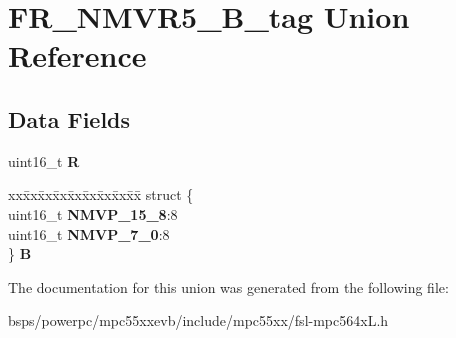 \hypertarget{unionFR__NMVR5__16B__tag}{}\section{F\+R\+\_\+\+N\+M\+V\+R5\+\_\+B\+\_\+tag Union Reference}
\label{unionFR__NMVR5__16B__tag}
\subsection*{Data Fields}
\begin{DoxyCompactItemize}
\item 
\mbox{\label{unionFR__NMVR5__16B__tag_ae0e45ba58f16ff993062fb8d672daa7f}} 
uint16\+\_\+t {\bfseries R}
\item 
\mbox{\label{unionFR__NMVR5__16B__tag_acc5908e79d72893ab63c12ff8897a3df}} 
\begin{tabbing}
xx\=xx\=xx\=xx\=xx\=xx\=xx\=xx\=xx\=\kill
struct \{\\
\>uint16\_t {\bfseries NMVP\_15\_8}:8\\
\>uint16\_t {\bfseries NMVP\_7\_0}:8\\
\} {\bfseries B}\\

\end{tabbing}\end{DoxyCompactItemize}


The documentation for this union was generated from the following file\+:\begin{DoxyCompactItemize}
\item 
bsps/powerpc/mpc55xxevb/include/mpc55xx/fsl-\/mpc564x\+L.\+h\end{DoxyCompactItemize}
